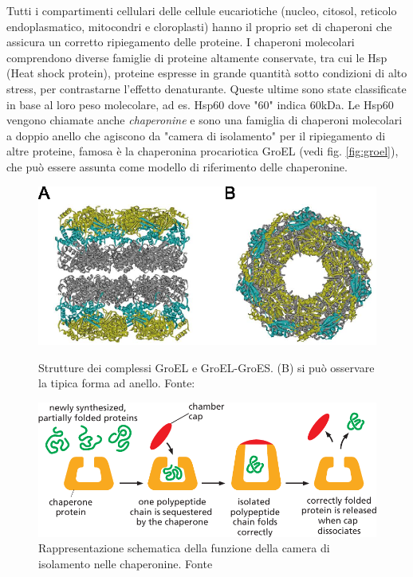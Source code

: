 {Tutti i compartimenti cellulari delle cellule eucariotiche (nucleo, citosol, reticolo endoplasmatico, mitocondri e cloroplasti) hanno il proprio set di chaperoni che assicura un corretto ripiegamento delle proteine. I chaperoni molecolari comprendono diverse famiglie di proteine altamente conservate, tra cui le Hsp (Heat shock protein), proteine espresse in grande quantità sotto condizioni di alto stress, per contrastarne l'effetto denaturante. Queste ultime sono state classificate in base al loro peso molecolare, ad es. Hsp60 dove "60" indica 60kDa. Le Hsp60 vengono chiamate anche \textit{chaperonine} e sono una famiglia di chaperoni molecolari a doppio anello che agiscono da "camera di isolamento" per il ripiegamento di altre proteine\supercite{ranson1998chaperonins}, famosa è la chaperonina procariotica GroEL (vedi fig. \ref{fig:groel}), che può essere assunta come modello di riferimento delle chaperonine. 

\begin{figure}[h]
	
\end{figure}

\begin{figure}[!htb]
	\includegraphics[scale=0.25]{images/groel.png}
	\caption{Strutture dei complessi GroEL e GroEL-GroES. (B) si può osservare la tipica forma ad anello. Fonte: \cite{Iizuka2016ChaperoninGU}}
	\label{fig:groel}
	\endminipage\hfill
	\centering
	\includegraphics[scale=0.4]{images/chaperone-alberts-isolation.png}
	\caption{Rappresentazione schematica della funzione della camera di isolamento nelle chaperonine. Fonte \cite{alberts2018essential}}
	\label{fig:chaperone-camera}
	\endminipage\hfill
\end{figure}

}
